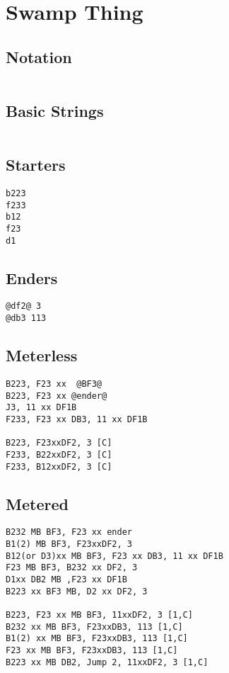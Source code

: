 \documentclass[main.tex MB]{subfiles}
\begin{document}
\chapter{Swamp Thing}

\section{Notation}
\begin{lstlisting}[language=FG]
\end{lstlisting}


\section{Basic Strings}

\begin{lstlisting}[language=FG]
\end{lstlisting}

\section{Starters}
\begin{lstlisting}[language=FG]
b223
f233
b12
f23
d1
\end{lstlisting}

\section{Enders}

\begin{lstlisting}[language=FG]
@df2@ 3
@db3 113
\end{lstlisting}

\section{Meterless}


\begin{lstlisting}[language=FG]
B223, F23 xx  @BF3@
B223, F23 xx @ender@
J3, 11 xx DF1B
F233, F23 xx DB3, 11 xx DF1B

B223, F23xxDF2, 3 [C]
F233, B22xxDF2, 3 [C]
F233, B12xxDF2, 3 [C]
\end{lstlisting}

\section{Metered}


\begin{lstlisting}[language=FG]
B232 MB BF3, F23 xx ender
B1(2) MB BF3, F23xxDF2, 3
B12(or D3)xx MB BF3, F23 xx DB3, 11 xx DF1B
F23 MB BF3, B232 xx DF2, 3
D1xx DB2 MB ,F23 xx DF1B
B223 xx BF3 MB, D2 xx DF2, 3

B223, F23 xx MB BF3, 11xxDF2, 3 [1,C]
B232 xx MB BF3, F23xxDB3, 113 [1,C]
B1(2) xx MB BF3, F23xxDB3, 113 [1,C]
F23 xx MB BF3, F23xxDB3, 113 [1,C]
B223 xx MB DB2, Jump 2, 11xxDF2, 3 [1,C]
\end{lstlisting}
\end{document}
